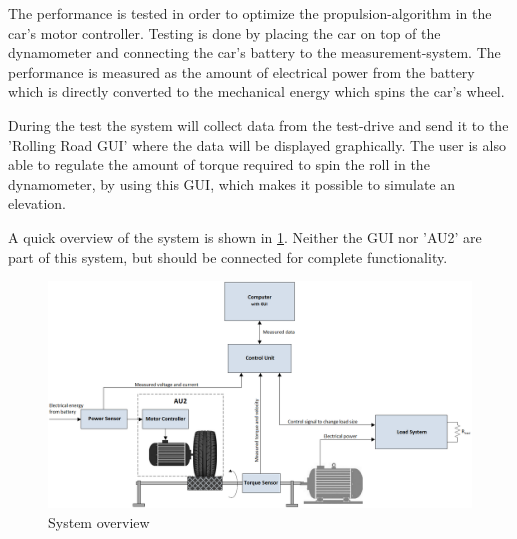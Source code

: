 The performance is tested in order to optimize the propulsion-algorithm in the car's motor controller. Testing is done by placing the car on top of the dynamometer and connecting the car's battery to the measurement-system. The performance is measured as the amount of electrical power from the battery which is directly converted to the mechanical energy which spins the car's wheel.

During the test the system will collect data from the test-drive and send it to the 'Rolling Road GUI' where the data will be displayed graphically. The user is also able to regulate the amount of torque required to spin the roll in the dynamometer, by using this GUI, which makes it possible to simulate an elevation. 

A quick overview of the system is shown in \ref{fig:System_overview}. Neither the GUI nor 'AU2' are part of this system, but should be connected for complete functionality.

\begin{figure}[H]
	\centering
	\includegraphics[width=1\linewidth]{Introduction/Overview}
	\caption{System overview}
	\label{fig:System_overview}
\end{figure}

\newpage
